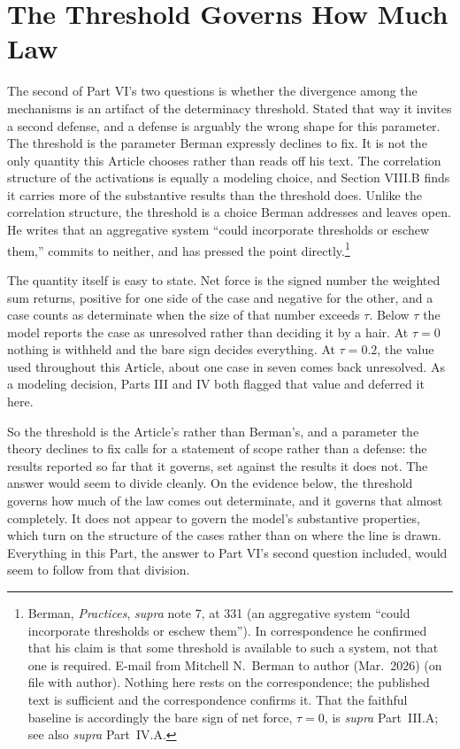 \section{The Threshold Governs How Much Law}

The second of Part VI's two questions is whether the divergence among the
mechanisms is an artifact of the determinacy threshold. Stated that way it
invites a second defense, and a defense is arguably the wrong shape for this
parameter. The threshold is the parameter Berman expressly declines to fix. It is not the only quantity this
Article chooses rather than reads off his text. The correlation structure of
the activations is equally a modeling choice, and Section VIII.B finds it
carries more of the substantive results than the threshold does. Unlike
the correlation structure, the threshold is a choice Berman addresses and
leaves open. He writes
that an aggregative system ``could incorporate thresholds or eschew
them,'' commits to neither, and has pressed the point
directly.\footnote{Berman, \textit{Practices}, \textit{supra} note 7, at
331 (an aggregative system ``could incorporate thresholds or eschew
them''). In correspondence he confirmed that his claim is that some
threshold is available to such a system, not that one is required.
E-mail from Mitchell N.\ Berman to author (Mar.\ 2026) (on file with
author). Nothing here rests on the correspondence; the published text is
sufficient and the correspondence confirms it. That the faithful baseline
is accordingly the bare sign of net force, $\tau = 0$, is \textit{supra}
Part~III.A; see also \textit{supra} Part~IV.A.}

The quantity itself is easy to state. Net force is the signed number the
weighted sum returns, positive for one side of the case and negative for
the other, and a case counts as determinate when the size of that number
exceeds $\tau$. Below $\tau$ the model reports the case as unresolved
rather than deciding it by a hair. At $\tau = 0$ nothing is withheld and the bare sign decides everything. At
$\tau = 0.2$, the value used throughout this Article, about one case in
seven comes back unresolved. As a modeling decision, Parts III and IV both
flagged that value and deferred it here.

So the threshold is the Article's rather than Berman's, and a parameter
the theory declines to fix calls for a statement of scope rather than a
defense: the results reported so far that it governs, set against the
results it does not. The answer would seem to divide cleanly. On the evidence below, the threshold governs how much of the law comes out
determinate, and it governs that almost completely. It does not appear to
govern the model's substantive properties, which turn on the
structure of the cases rather than on where the line is drawn. Everything
in this Part, the answer to Part VI's second question included, would seem
to follow from that division.

